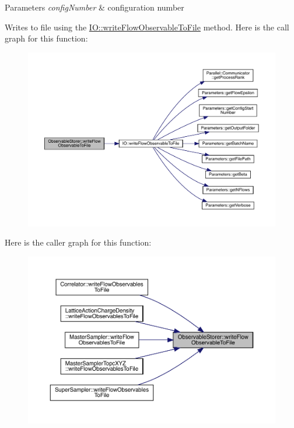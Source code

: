 \begin{DoxyParams}{Parameters}
{\em config\+Number} & configuration number\\
\hline
\end{DoxyParams}
Writes to file using the \mbox{\hyperlink{namespace_i_o_a4f554804fd2ccd9c13c73777c5cbbf77}{I\+O\+::write\+Flow\+Observable\+To\+File}} method. Here is the call graph for this function\+:\nopagebreak
\begin{figure}[H]
\begin{center}
\leavevmode
\includegraphics[width=350pt]{class_observable_storer_af51ebd65eae2a5087cfd47ddf230da93_cgraph}
\end{center}
\end{figure}
Here is the caller graph for this function\+:\nopagebreak
\begin{figure}[H]
\begin{center}
\leavevmode
\includegraphics[width=350pt]{class_observable_storer_af51ebd65eae2a5087cfd47ddf230da93_icgraph}
\end{center}
\end{figure}
\mbox{\label{class_observable_storer_a146f9acb8a0a2ce15782d26bdc4f0bf9}} 
